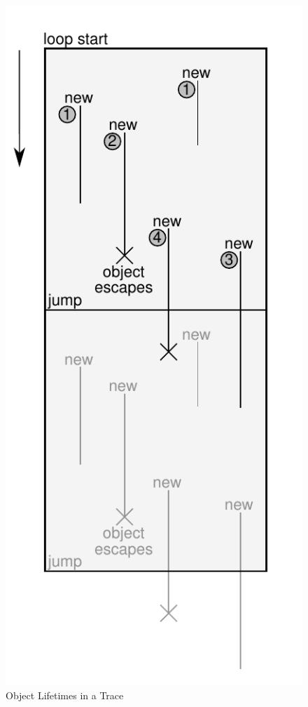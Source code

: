 \documentclass{sigplanconf}
\begin{document}
\begin{figure}
\begin{center}
\includegraphics[scale=0.6]{figures/obj-lifetime.pdf}
\end{center}

\caption{Object Lifetimes in a Trace}
\label{fig:lifetimes}
\end{figure}
\end{document}
